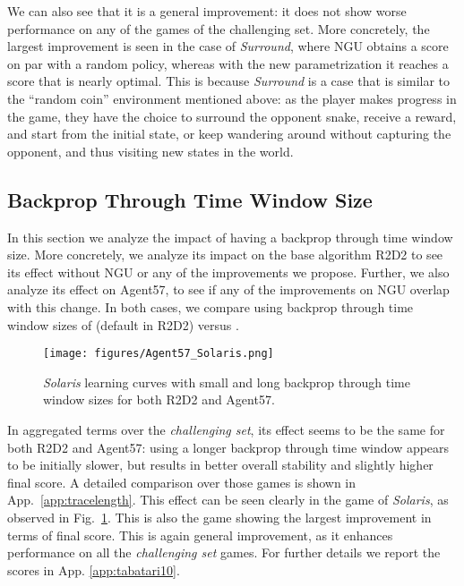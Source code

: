 \documentclass{article}
\begin{document}
We can also see that it is a general improvement: it does not show worse performance on any of the  games of the challenging set. More concretely, the largest improvement is seen in the case of \textit{Surround}, where NGU obtains a score on par with a random policy, whereas with the new parametrization it reaches a score that is nearly optimal. This is because \textit{Surround} is a case that is similar to the ``random coin'' environment mentioned above: as the player makes progress in the game, they have the choice to surround the opponent snake, receive a reward, and start from the initial state, or keep wandering around without capturing the opponent, and thus visiting new states in the world.

\subsection{Backprop Through Time Window Size}
\label{subsec:tracelength}

In this section we analyze the impact of having a backprop through time window size. More concretely, we analyze its impact on the base algorithm R2D2 to see its effect without NGU or any of the improvements we propose. Further, we also analyze its effect on Agent57, to see if any of the improvements on NGU overlap with this change. In both cases, we compare using backprop through time window sizes of  (default in R2D2) versus .

\begin{figure}[!t]
    \centering
    \texttt{[image: figures/Agent57\_Solaris.png]}
    \caption{\textit{Solaris} learning curves with small and long backprop through time window sizes for both R2D2 and Agent57.} 
    \label{fig:solaristracelength}
    \vspace{-3ex}
\end{figure}

In aggregated terms over the \emph{challenging set}, its effect seems to be the same for both R2D2 and Agent57: using a longer backprop through time window appears to be initially slower, but results in better overall stability and slightly higher final score. A detailed comparison over those  games is shown in App.~\ref{app:tracelength}. This effect can be seen clearly in the game of \textit{Solaris}, as observed in Fig.~\ref{fig:solaristracelength}. This is also the game showing the largest improvement in terms of final score.
This is again general improvement, as it enhances performance on all the \emph{challenging set} games. For further details we report the scores in App. \ref{app:tabatari10}.
\end{document}
